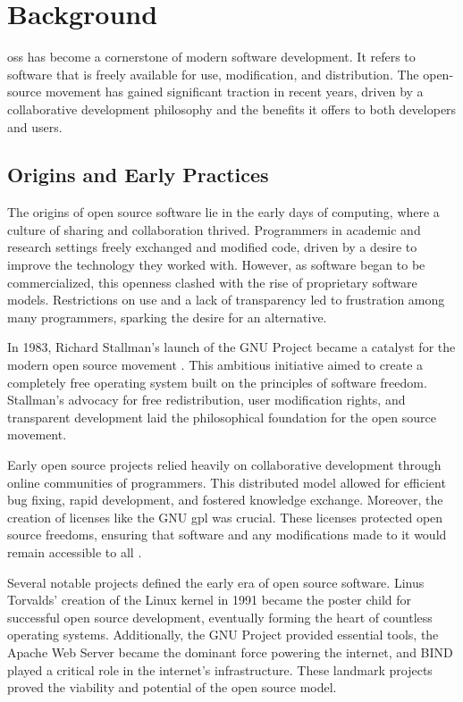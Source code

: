 \section{Background}

\ac{oss} has become a cornerstone of modern software development. It refers to software that is freely available for use, modification, and distribution. The open-source movement has gained significant traction in recent years, driven by a collaborative development philosophy and the benefits it offers to both developers and users.


\subsection{Origins and Early Practices}

The origins of open source software lie in the early days of computing, where a culture of sharing and collaboration thrived. Programmers in academic and research settings freely exchanged and modified code, driven by a desire to improve the technology they worked with. However, as software began to be commercialized, this openness clashed with the rise of proprietary software models. Restrictions on use and a lack of transparency led to frustration among many programmers, sparking the desire for an alternative.

In 1983, Richard Stallman's launch of the GNU Project became a catalyst for the modern open source movement \cite{dibona1999open}.  This ambitious initiative aimed to create a completely free operating system built on the principles of software freedom.  Stallman's advocacy for free redistribution, user modification rights, and transparent development laid the philosophical foundation for the open source movement.

Early open source projects relied heavily on collaborative development through online communities of programmers. This distributed model allowed for efficient bug fixing, rapid development, and fostered knowledge exchange.  Moreover, the creation of licenses like the GNU \ac{gpl} was crucial. These licenses protected open source freedoms, ensuring that software and any modifications made to it would remain accessible to all \cite{license1989gnu}.


Several notable projects defined the early era of open source software. Linus Torvalds' creation of the Linux kernel in 1991 became the poster child for successful open source development, eventually forming the heart of countless operating systems. Additionally, the GNU Project provided essential tools, the Apache Web Server became the dominant force powering the internet, and BIND played a critical role in the internet's infrastructure. These landmark projects proved the viability and potential of the open source model.


